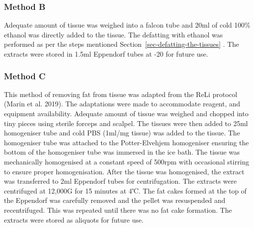 \documentclass[
  letterpaper,
  DIV=11,
  numbers=noendperiod]{scrreprt}
\begin{document}
\subsubsection{\texorpdfstring{\textbf{Method
B}}{Method B}}\label{sec-method-b}

Adequate amount of tissue was weighed into a falcon tube and 20ml of
cold 100\% ethanol was directly added to the tissue. The defatting with
ethanol was performed as per the steps mentioned
Section~\ref{sec-defatting-the-tissues} . The extracts were stored in
1.5ml Eppendorf tubes at -20 for future use.

\subsubsection{\texorpdfstring{\textbf{Method
C}}{Method C}}\label{sec-method-c}

This method of removing fat from tissue was adapted from the ReLi
protocol (Marin et al. 2019). The adaptations were made to accommodate
reagent, and equipment availability. Adequate amount of tissue was
weighed and chopped into tiny pieces using sterile forceps and scalpel.
The tissues were then added to 25ml homogeniser tube and cold PBS
(1ml/mg tissue) was added to the tissue. The homogeniser tube was
attached to the Potter-Elvehjem homogeniser ensuring the bottom of the
homogeniser tube was immersed in the ice bath. The tissue was
mechanically homogenised at a constant speed of 500rpm with occasional
stirring to ensure proper homogenisation. After the tissue was
homogenised, the extract was transferred to 2ml Eppendorf tubes for
centrifugation. The extracts were centrifuged at 12,000G for 15 minutes
at 4℃. The fat cakes formed at the top of the Eppendorf was carefully
removed and the pellet was resuspended and recentrifuged. This was
repeated until there was no fat cake formation. The extracts were stored
as aliquots for future use.
\end{document}
